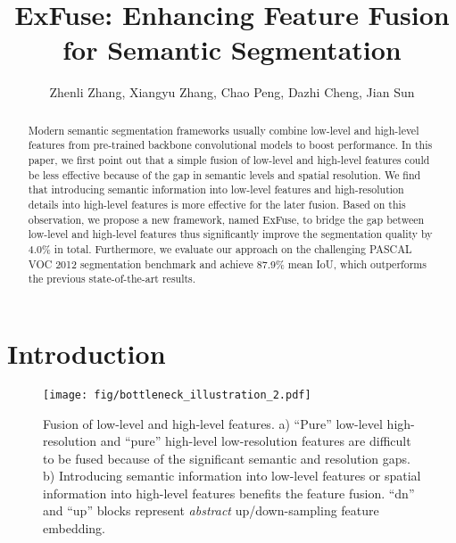 \documentclass[runningheads]{llncs}
\begin{document}
\pagestyle{headings}
\mainmatter
\def\ECCV18SubNumber{1817}  

\title{ExFuse: Enhancing Feature Fusion for Semantic Segmentation} 





\author{Zhenli Zhang, Xiangyu Zhang, Chao Peng, Dazhi Cheng, Jian Sun
}



\maketitle

\begin{abstract}
Modern semantic segmentation frameworks usually combine low-level and high-level features from pre-trained backbone convolutional models to boost performance. In this paper, we first point out that a simple fusion of low-level and high-level features could be less effective because of the gap in semantic levels and spatial resolution. We find that introducing semantic information into low-level features and high-resolution details into high-level features is more effective for the later fusion. Based on this observation, we propose a new framework, named ExFuse, to bridge the gap between low-level and high-level features thus significantly improve the segmentation quality by 4.0\% in total. Furthermore, we evaluate our approach on the challenging PASCAL VOC 2012 segmentation benchmark and achieve 87.9\% mean IoU, which outperforms the previous state-of-the-art results.
\end{abstract}


\section{Introduction}
\label{sec:introduction}

\begin{figure}[htbp]
	\centering
	\texttt{[image: fig/bottleneck\_illustration\_2.pdf]}
	\caption{Fusion of low-level and high-level features. a) ``Pure'' low-level high-resolution and ``pure'' high-level low-resolution features are difficult to be fused because of the significant semantic and resolution gaps. b) Introducing semantic information into low-level features or spatial information into high-level features benefits the feature fusion. ``dn'' and ``up'' blocks represent \emph{abstract} up/down-sampling feature embedding.}
	\label{fig:concept}
\end{figure}
\end{document}
